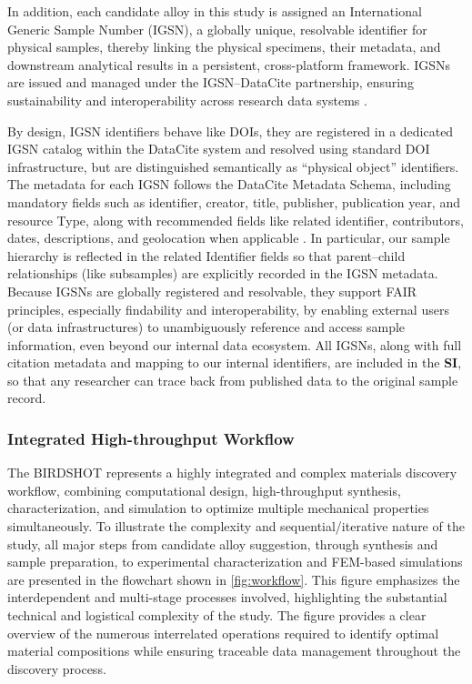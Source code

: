 
In addition, each candidate alloy in this study is assigned an International Generic Sample Number (IGSN), a globally unique, resolvable identifier for physical samples, thereby linking the physical specimens, their metadata, and downstream analytical results in a persistent, cross-platform framework. IGSNs are issued and managed under the IGSN–DataCite partnership, ensuring sustainability and interoperability across research data systems \cite{datacite-igsn-ids}. 

By design, IGSN identifiers behave like DOIs, they are registered in a dedicated IGSN catalog within the DataCite system and resolved using standard DOI infrastructure, but are distinguished semantically as “physical object” identifiers. The metadata for each IGSN follows the DataCite Metadata Schema, including mandatory fields such as identifier, creator, title, publisher, publication year, and resource Type, along with recommended fields like related identifier, contributors, dates, descriptions, and geolocation when applicable \cite{igsn-metadata-schema}. In particular, our sample hierarchy is reflected in the related Identifier fields so that parent–child relationships (like subsamples) are explicitly recorded in the IGSN metadata. Because IGSNs are globally registered and resolvable, they support FAIR principles, especially findability and interoperability, by enabling external users (or data infrastructures) to unambiguously reference and access sample information, even beyond our internal data ecosystem. All IGSNs, along with full citation metadata and mapping to our internal identifiers, are included in the \textbf{SI}, so that any researcher can trace back from published data to the original sample record.

\subsubsection{Integrated High-throughput Workflow}

The BIRDSHOT represents a highly integrated and complex materials discovery workflow, combining computational design, high-throughput synthesis, characterization, and simulation to optimize multiple mechanical properties simultaneously. To illustrate the complexity and sequential/iterative nature of the study, all major steps from candidate alloy suggestion, through synthesis and sample preparation, to experimental characterization and FEM-based simulations are presented in the flowchart shown in \autoref{fig:workflow}. This figure emphasizes the interdependent and multi-stage processes involved, highlighting the substantial technical and logistical complexity of the study. The figure provides a clear overview of the numerous interrelated operations required to identify optimal material compositions while ensuring traceable data management throughout the discovery process.

